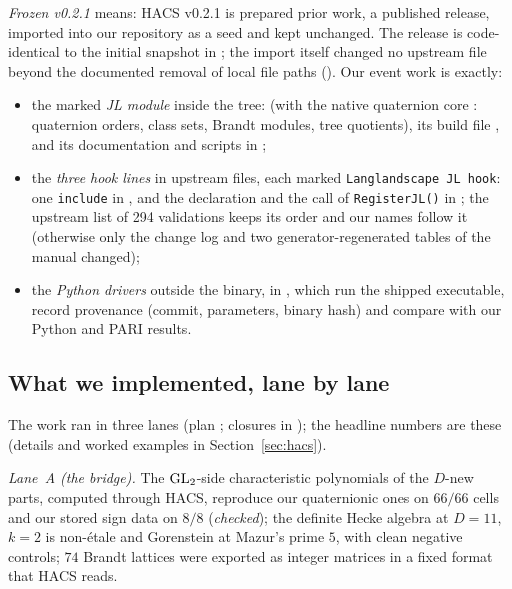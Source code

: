 \emph{Frozen v0.2.1} means: HACS v0.2.1 is prepared prior work, a published release, imported into our repository as a seed and
kept unchanged. The release is code-identical to the initial snapshot in ; the import itself changed no
upstream file beyond the documented removal of local file paths (). Our event work is exactly:
\begin{itemize}
\item the marked \emph{JL module} inside the tree:  (with the native quaternion core
  : quaternion orders, class sets, Brandt modules, tree quotients), its build file
  , and its documentation and scripts in ;
\item the \emph{three hook lines} in upstream files, each marked \texttt{Langlandscape JL hook}: one \texttt{include} in
  , and the declaration and the call of \texttt{RegisterJL()} in ;
  the upstream list of 294 validations keeps its order and our names follow it (otherwise only the change log and two
  generator-regenerated tables of the manual changed);
\item the \emph{Python drivers} outside the binary, in , which run the shipped
  executable, record provenance (commit, parameters, binary hash) and compare with our Python and PARI results.
\end{itemize}

\subsection*{What we implemented, lane by lane}
The work ran in three lanes (plan ; closures in ); the headline numbers
are these\ifdefined\sOOsummary{} (details and worked examples in Section~\ref{sec:hacs})\fi.

\emph{Lane~A (the bridge).} The $\mathrm{GL}_2$-side characteristic polynomials of the $D$-new parts, computed through HACS, reproduce our
quaternionic ones on $66/66$ cells and our stored sign data on $8/8$ (\emph{checked}); the definite Hecke algebra at $D=11$,
$k=2$ is non-\'etale and Gorenstein at Mazur's prime $5$, with clean negative controls; $74$ Brandt lattices were exported as
integer matrices in a fixed format that HACS reads.

